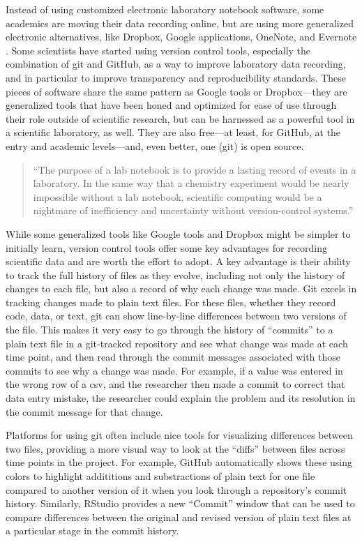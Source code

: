 \documentclass[]{tufte-book}
\begin{document}
Instead of using customized electronic laboratory notebook software, some
academics are moving their data recording online, but are using more generalized
electronic alternatives, like Dropbox, Google applications, OneNote, and
Evernote \citep{perkel2011coding, kwok2018lab, giles2012digital, powell2012lab}.
Some scientists have started using version control tools, especially the
combination of git and GitHub, as a way to improve laboratory data recording,
and in particular to improve transparency and reproducibility standards.
These pieces of software share the same pattern as Google tools or
Dropbox---they are generalized tools that have been honed and optimized for ease
of use through their role outside of scientific research, but can be harnessed
as a powerful tool in a scientific laboratory, as well. They are also free---at
least, for GitHub, at the entry and academic levels---and, even better, one
(git) is open source.

\begin{quote}
``The purpose of a lab notebook is to provide a lasting record of events in a
laboratory. In the same way that a chemistry experiment would be nearly
impossible without a lab notebook, scientific computing would be a nightmare of
inefficiency and uncertainty without version-control systems.''
\citep{tippmannmy2014digital}
\end{quote}

While some generalized tools like Google tools and Dropbox might be simpler to
initially learn, version control tools offer some key advantages for recording
scientific data and are worth the effort to adopt. A key advantage is their
ability to track the full history of files as they evolve, including not only
the history of changes to each file, but also a record of why each change was
made. Git excels in tracking changes made to plain text
files. For these files, whether they record code, data, or text, git can show
line-by-line differences between two versions of the file. This makes it very
easy to go through the history of ``commits'' to a plain text file in a
git-tracked repository and see what change was made at each time point, and then
read through the commit messages associated with those commits to see why a
change was made. For example, if a value was entered in the wrong row of a csv,
and the researcher then made a commit to correct that data entry mistake, the
researcher could explain the problem and its resolution in the commit message
for that change.

Platforms for using git often include nice tools for visualizing differences
between two files, providing a more visual way to look at the ``diffs'' between
files across time points in the project. For example, GitHub automatically shows
these using colors to highlight addititions and substractions of plain text for
one file compared to another version of it when you look through a repository's
commit history. Similarly, RStudio provides a new ``Commit'' window that can be
used to compare differences between the original and revised version of plain
text files at a particular stage in the commit history.
\end{document}
